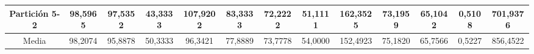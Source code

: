 \documentclass[12pt]{article}
\begin{document}
\begin{table}[H]
{\begin{tabular}{|c|cccc|cccc|cccc|}
Partición 5-2 & \multicolumn{1}{c|}{98,5965}                                                  & \multicolumn{1}{c|}{97,5352}                                                 & \multicolumn{1}{c|}{43,3333} & 107,9202 & \multicolumn{1}{c|}{83,3333}                                                  & \multicolumn{1}{c|}{72,2222}                                                 & \multicolumn{1}{c|}{51,1111} & 162,3525 & \multicolumn{1}{c|}{73,1959}                                                  & \multicolumn{1}{c|}{65,1042}                                                 & \multicolumn{1}{c|}{0,5108}  & 701,9376  \\ \hline
Media         & \multicolumn{1}{c|}{98,2074}                                                  & \multicolumn{1}{c|}{95,8878}                                                 & \multicolumn{1}{c|}{50,3333} & 96,3421  & \multicolumn{1}{c|}{77,8889}                                                  & \multicolumn{1}{c|}{73,7778}                                                 & \multicolumn{1}{c|}{54,0000} & 152,4923 & \multicolumn{1}{c|}{75,1820}                                                  & \multicolumn{1}{c|}{65,7566}                                                 & \multicolumn{1}{c|}{0,5227}  & 856,4522  \\ \hline
\end{tabular}}
\end{table}
\end{document}
